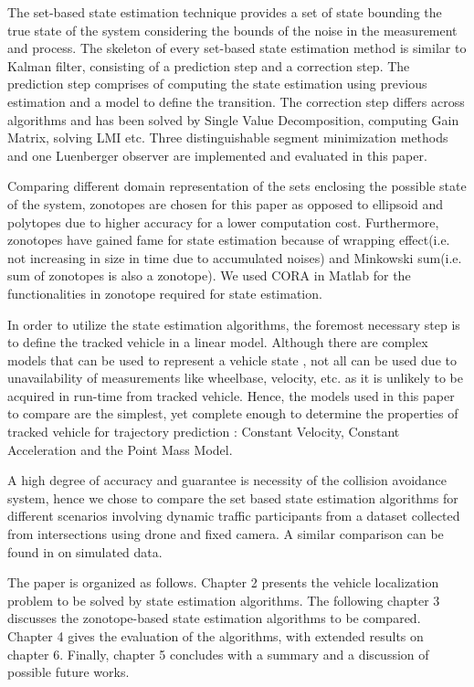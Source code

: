 The set-based state estimation technique provides a set of state bounding the true state of the system considering the bounds of the noise in the measurement and process. The skeleton of every set-based state estimation method is similar to Kalman filter, consisting of a prediction step and a correction step. The prediction step comprises of computing the state estimation using previous estimation and a model to define the transition. The correction step differs across algorithms and has been solved by Single Value Decomposition, computing Gain Matrix, solving LMI etc. Three distinguishable segment minimization methods and one Luenberger observer are implemented and evaluated in this paper. 

Comparing different domain representation of the sets enclosing the possible state of the system, zonotopes are chosen for this paper as opposed to ellipsoid and polytopes due to higher accuracy for a lower computation cost. Furthermore, zonotopes have gained fame for state estimation because of wrapping effect(i.e. not increasing in size in time due to accumulated noises) and Minkowski sum(i.e. sum of zonotopes is also a zonotope). We used CORA in Matlab\textsuperscript{\tiny\textregistered} for the functionalities in zonotope required for state estimation.

In order to utilize the state estimation algorithms, the foremost necessary step is to define the tracked vehicle in a linear model. Although there are complex models that can be used to represent a vehicle state \cite{Althoff}, not all can be used due to unavailability of measurements like wheelbase, velocity, etc. as it is unlikely to be acquired in run-time from tracked vehicle. Hence, the models used in this paper to compare are the simplest, yet complete enough to determine the properties of tracked vehicle for trajectory prediction : Constant Velocity, Constant Acceleration and the Point Mass Model.

A high degree of accuracy and guarantee is necessity of the collision avoidance system, hence we chose to compare the set based state estimation algorithms for different scenarios involving dynamic traffic participants from a dataset collected from intersections using drone and fixed camera. A similar comparison can be found in \cite{Rath} on simulated data.

The paper is organized as follows. Chapter 2 presents the vehicle localization problem to be solved by state estimation algorithms. The following chapter 3 discusses the zonotope-based state estimation algorithms to be compared. Chapter 4 gives the evaluation of the algorithms, with extended results on chapter 6. Finally, chapter 5 concludes with a summary and a discussion of possible future works.




